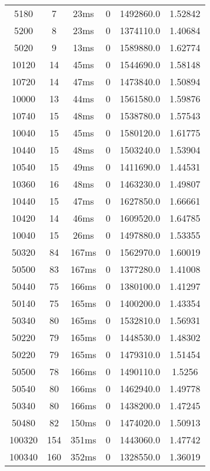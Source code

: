 \documentclass[./main.tex]{subfiles}
\begin{document}
\begin{table}
\begin{tabular}{ c | c | c | c | c | c }
        5180 & 7 & 23ms & 0 & 1492860.0 & 1.52842 \\
        5200 & 8 & 23ms & 0 & 1374110.0 & 1.40684 \\
        5020 & 9 & 13ms & 0 & 1589880.0 & 1.62774 \\
        \hline
        10120 & 14 & 45ms & 0 & 1544690.0 & 1.58148 \\
        10720 & 14 & 47ms & 0 & 1473840.0 & 1.50894 \\
        10000 & 13 & 44ms & 0 & 1561580.0 & 1.59876 \\
        \rowcolor{lightgray} 10740 & 15 & 48ms & 0 & 1538780.0 & 1.57543 \\
        10040 & 15 & 45ms & 0 & 1580120.0 & 1.61775 \\
        10440 & 15 & 48ms & 0 & 1503240.0 & 1.53904 \\
        10540 & 15 & 49ms & 0 & 1411690.0 & 1.44531 \\
        10360 & 16 & 48ms & 0 & 1463230.0 & 1.49807 \\
        10440 & 15 & 47ms & 0 & 1627850.0 & 1.66661 \\
        10420 & 14 & 46ms & 0 & 1609520.0 & 1.64785 \\
        10040 & 15 & 26ms & 0 & 1497880.0 & 1.53355 \\
        \hline
        50320 & 84 & 167ms & 0 & 1562970.0 & 1.60019 \\
        50500 & 83 & 167ms & 0 & 1377280.0 & 1.41008 \\
        50440 & 75 & 166ms & 0 & 1380100.0 & 1.41297 \\
        50140 & 75 & 165ms & 0 & 1400200.0 & 1.43354 \\
        50340 & 80 & 165ms & 0 & 1532810.0 & 1.56931 \\
        50220 & 79 & 165ms & 0 & 1448530.0 & 1.48302 \\
        50220 & 79 & 165ms & 0 & 1479310.0 & 1.51454 \\
        50500 & 78 & 166ms & 0 & 1490110.0 & 1.5256 \\
        \rowcolor{lightgray} 50540 & 80 & 166ms & 0 & 1462940.0 & 1.49778 \\
        50340 & 80 & 166ms & 0 & 1438200.0 & 1.47245 \\
        50480 & 82 & 150ms & 0 & 1474020.0 & 1.50913 \\
        \hline
        100320 & 154 & 351ms & 0 & 1443060.0 & 1.47742 \\
        100340 & 160 & 352ms & 0 & 1328550.0 & 1.36019 \\

\end{tabular}
\end{table}
\end{document}
